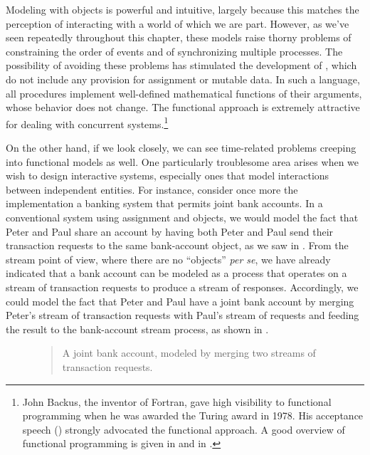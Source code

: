 Modeling with objects is powerful and intuitive, largely because this matches
the perception of interacting with a world of which we are part.  However, as
we've seen repeatedly throughout this chapter, these models raise thorny
problems of constraining the order of events and of synchronizing multiple
processes.  The possibility of avoiding these problems has stimulated the
development of , which do not include
any provision for assignment or mutable data.  In such a language, all
procedures implement well-defined mathematical functions of their arguments,
whose behavior does not change.  The functional approach is extremely
attractive for dealing with concurrent systems.\footnote{John Backus, the
inventor of Fortran, gave high visibility to functional programming when he was
awarded the  Turing award in 1978.  His acceptance speech
() strongly advocated the functional approach.  A good overview of
functional programming is given in  and in
.}

On the other hand, if we look closely, we can see time-related problems
creeping into functional models as well.  One particularly troublesome area
arises when we wish to design interactive systems, especially ones that model
interactions between independent entities.  For instance, consider once more
the implementation a banking system that permits joint bank accounts.  In a
conventional system using assignment and objects, we would model the fact that
Peter and Paul share an account by having both Peter and Paul send their
transaction requests to the same bank-account object, as we saw in
.  From the stream point of view, where there are no ``objects''
\emph{per se}, we have already indicated that a bank account can be modeled as
a process that operates on a stream of transaction requests to produce a stream
of responses.  Accordingly, we could model the fact that Peter and Paul have a
joint bank account by merging Peter's stream of transaction requests with
Paul's stream of requests and feeding the result to the bank-account stream
process, as shown in .

\begin{figure}[tb]
\label{Figure 3.38}
\centering
\begin{comment}
\heading{Figure 3.38:} A joint bank account, modeled by merging two streams of transaction requests.

\begin{example}
Peter's requests   +---------+     +---------+
------------------>|         |     |         |
Paul's requests    |  merge  |---->| bank    |---->
------------------>|         |     | account |
                   +---------+     +---------+
\end{example}
\end{comment}

\begin{quote}
 A joint bank account, modeled by merging two streams of transaction requests.
\end{quote}
\end{figure}

